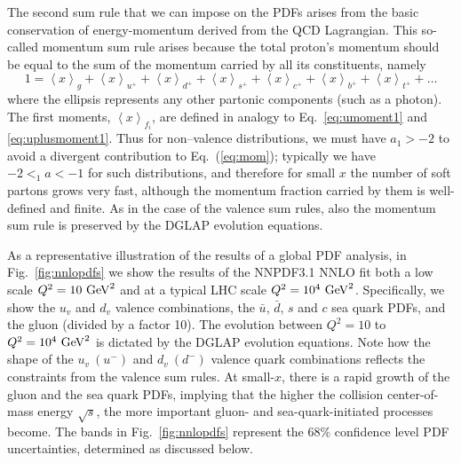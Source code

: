 The second sum rule that we can impose on the PDFs arises
from the basic conservation of energy-momentum derived from
the QCD Lagrangian.
%
This so-called momentum sum rule arises
because the total
proton's momentum should be equal to the sum of the momentum
carried by all its constituents, namely
\begin{equation}\label{eq:mom}
1 = \left\langle x\right\rangle _{g}+\left\langle x\right\rangle _{u^{+}}+\left\langle x\right\rangle _{d^{+}}+\left\langle x\right\rangle _{s^{+}}+\left\langle x\right\rangle _{c^{+}}+\left\langle x\right\rangle _{b^{+}}+\left\langle x\right\rangle _{t^{+}}+\ldots
\end{equation}
%
where the ellipsis represents any other partonic components (such
as a photon). The first moments, $\left\langle x\right\rangle _{f_i}$, are defined in analogy to Eq.~\eqref{eq:umoment1} and \eqref{eq:uplusmoment1}. Thus for non--valence distributions, we must have $a_1>-2$ to avoid a divergent contribution to
Eq.~(\ref{eq:mom}); typically we have $-2<_1a<-1$ for such distributions, and therefore for small $x$ the number of soft partons
grows very fast, although the momentum fraction carried by them is well-defined
and finite.
%
As in the case of the valence sum rules, also the momentum
sum rule is preserved by the DGLAP evolution equations.

As a representative illustration of the results of a global
PDF analysis, in Fig.~\ref{fig:nnlopdfs} we show
the results of the NNPDF3.1 NNLO fit both  a low scale
    $Q^2=10~{\rm GeV}^2$  and at a typical LHC scale
    $Q^2=10^4~{\rm GeV}^2$.
    Specifically, we show the  $u_v$ and $d_v$ valence combinations, the $\bar{u}$,
    $\bar{d}$, $s$ and $c$ sea quark PDFs, and the gluon (divided by a factor 10).
    The evolution between $Q^2=10$ to $Q^2=10^4~{\rm GeV}^2$ is dictated
    by the DGLAP evolution equations.
    Note how the shape of the $u_v~(u^{-})$ and $d_v~(d^{-})$ valence quark combinations
    reflects the constraints from the valence sum rules.
    At small-$x$, there is a rapid growth of the gluon and the sea quark PDFs, implying
    that the higher the collision center-of-mass energy $\sqrt{s}$, the more
    important gluon- and sea-quark-initiated processes become.
    The bands in Fig.~\ref{fig:nnlopdfs} represent the 68\% confidence level
    PDF uncertainties, determined as discussed below.


